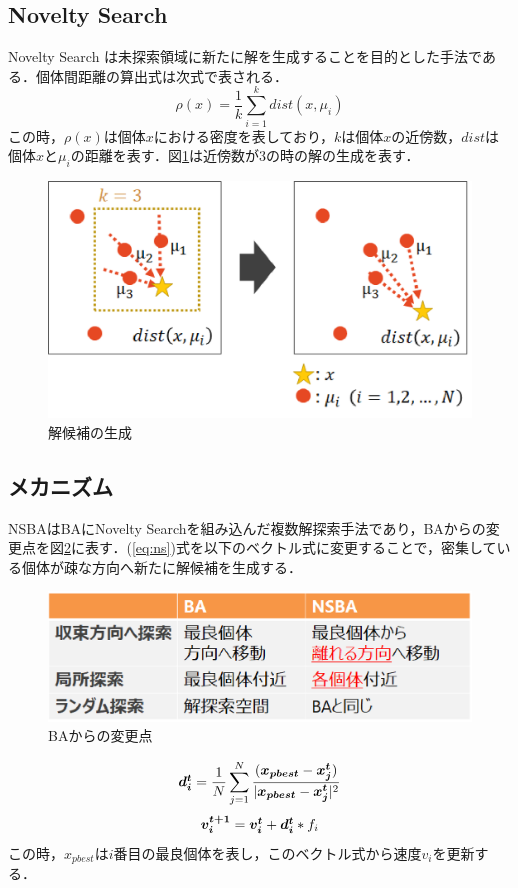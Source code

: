 \documentclass[a4j,11pt]{jarticle}
\begin{document}
\subsection{Novelty Search}
\label{ss:NS}
Novelty Search \cite{NS} は未探索領域に新たに解を生成することを目的とした手法である．個体間距離の算出式は次式で表される．
\begin{equation}
\label{eq:ns}
\rho(x)=\frac{1}{k}\sum_{i=1}^k dist(x,\mu_i)
\end{equation}
この時，$\rho(x)$は個体$x$における密度を表しており，$kは$個体$x$の近傍数，$dist$は個体$x$と$\mu_i$の距離を表す．図\ref{fig:ns}は近傍数が3の時の解の生成を表す．
\begin{figure}[h]
  \centering
  \includegraphics[width=0.8\linewidth]{eps/IES2018/ns.eps}
  \caption{解候補の生成}
  \label{fig:ns}
\end{figure}

\subsection{メカニズム}
\label{ss:NSBA-abst}
NSBAはBAにNovelty Searchを組み込んだ複数解探索手法であり，BAからの変更点を図\ref{fig:nsba_table}に表す．(\ref{eq:ns})式を以下のベクトル式に変更することで，密集している個体が疎な方向へ新たに解候補を生成する．

\begin{figure}
  \centering
  \includegraphics[width=0.7\linewidth]{eps/nsba_table.eps}
  \caption{BAからの変更点}
  \label{fig:nsba_table}
\end{figure}
\begin{equation}
\mbox{\boldmath $d_i^{t}$} = \frac {1}{N} \sum _{j=1}^N \frac {(\mbox{\boldmath $x_{pbest}$}-\mbox{\boldmath $x_j^{t}$})}{|\mbox{\boldmath $x_{pbest}$}-\mbox{\boldmath $x_j^{t}$}|^2}
\label{eq:nd*}
\end{equation}
\begin{equation}
\mbox{\boldmath $v_i^{t+1}$}=\mbox{\boldmath $v_i^{t}$}+\mbox{\boldmath $d_i^{t}$}*f_i
\label{eq:nsvi}
\end{equation}
この時，$x_{pbest}$は$i$番目の最良個体を表し，このベクトル式から速度$v_i$を更新する．
\end{document}
